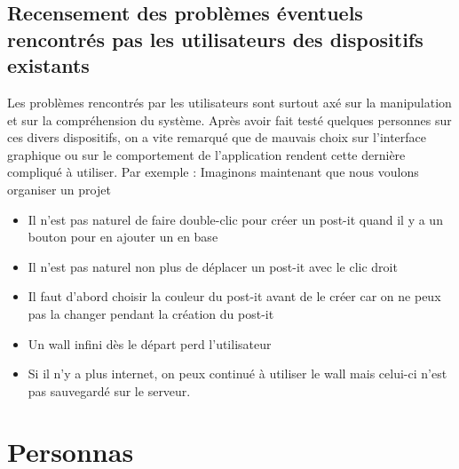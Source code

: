 \documentclass{article}
\begin{document}
\subsection{Recensement des problèmes éventuels rencontrés pas les utilisateurs des dispositifs existants}
\hspace*{0.6cm}Les problèmes rencontrés par les utilisateurs sont surtout axé sur la manipulation et sur la compréhension du système. Après avoir fait testé quelques personnes sur ces divers dispositifs, on a vite remarqué que de mauvais choix sur l'interface graphique ou sur le comportement de l'application rendent cette dernière compliqué à utiliser. Par exemple :
\vspace{0.2cm}
Imaginons maintenant que nous voulons organiser un projet
\begin{itemize}
  \item Il n'est pas naturel de faire double-clic pour créer un post-it quand il y a un bouton pour en ajouter un en base
  \item Il n'est pas naturel non plus de déplacer un post-it avec le clic droit
  \item Il faut d'abord choisir la couleur du post-it avant de le créer car on ne peux pas la changer pendant la création du post-it
  \item Un wall infini dès le départ perd l'utilisateur
  \item Si il n'y a plus internet, on peux continué à utiliser le wall mais celui-ci n'est pas sauvegardé sur le serveur.
\end{itemize}

\section{Personnas}
\end{document}
